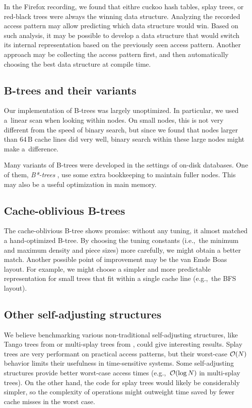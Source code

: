 In the Firefox recording, we found that eithre cuckoo hash tables, splay trees,
or red-black trees were always the winning data structure. Analyzing the
recorded access pattern may allow predicting which data structure would win.
Based on such analysis, it may be possible to develop a data structure that
would switch its internal representation based on the previously seen access
pattern. Another approach may be collecting the access pattern first, and
then automatically choosing the best data structure at compile time.

\subsection{B-trees and their variants}
Our implementation of \mbox{B-trees} was largely unoptimized. In particular,
we used a~linear scan when looking within nodes. On small nodes, this is
not very different from the speed of binary search, but since we found
that nodes larger than $64\,\text{B}$ cache lines did very well, binary search
within these large nodes might make a~difference.

Many variants of B-trees were developed in the settings of on-disk databases.
One of them, \emph{B*-trees} \cite{bstar}, use some extra bookkeeping to
maintain fuller nodes. This may also be a useful optimization in main memory.

\subsection{Cache-oblivious B-trees}
The cache-oblivious B-tree shows promise: without any tuning, it almost
matched a hand-optimized B-tree. By choosing the tuning constants (i.e.,\ the
minimum and maximum density and piece sizes) more carefully, we might obtain
a better match. Another possible point of improvement may be the van Emde Boas
layout. For example, we might choose a simpler and more predictable
representation for small trees that fit within a single cache line
(e.g.,\ the BFS layout).

\subsection{Other self-adjusting structures}
We believe benchmarking various non-traditional self-adjusting structures,
like Tango trees from \cite{tango} or multi-splay trees from
\cite{multisplay-trees}, could give interesting results. Splay trees are very
performant on practical access patterns, but their worst-case $\mathcal{O}(N)$ behavior
limits their usefulness in time-sensitive systems. Some self-adjusting
structures provide better worst-case access times (e.g.,\ $\mathcal{O}(\log N)$ in
multi-splay trees). On the other hand, the code for splay trees would
likely be considerably simpler, so the complexity of operations might outweight
time saved by fewer cache misses in the worst case.

